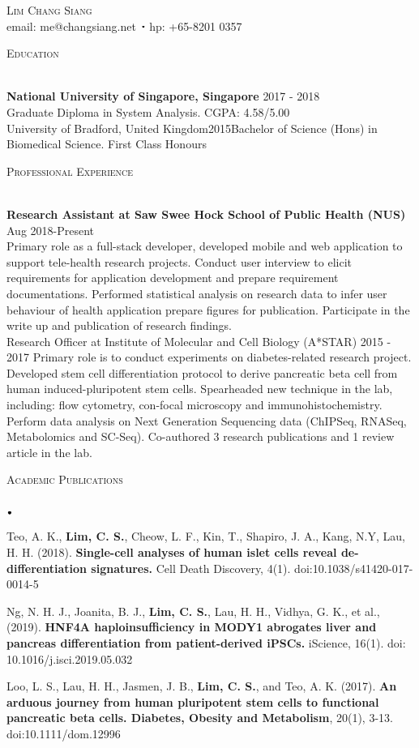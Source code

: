 \documentclass[11pt]{article}
\newcommand{\lineunder}{\vspace*{-8pt} \\ \hspace*{-18pt} \hrulefill \\}
\newcommand{\header}[1]{{\hspace*{-15pt}\vspace*{6pt} \textsc{#1}} \vspace*{-6pt} \lineunder}
\newcommand{\contact}[2]{
\begin{center}
{\LARGE \scshape {#1}}\\
#2
\end{center}
\vspace*{-8pt}
}
\newcommand{\sbt}{\,\begin{picture}(-1,1)(-1,-3)\circle*{2}\end{picture}\ }
\newcommand{\lbt}{\,\begin{picture}(-1,1)(-1,-3)\circle*{3}\end{picture}\ }
\newenvironment{achievements}{
    \begin{list}{$\lbt$}{
        \topsep 0pt
        \itemsep 0pt
        \addtolength{\leftmargin}{-0.1in}
    }
}
{
    \vspace*{4pt}
    \end{list}
}
\newcommand{\schoolwithcourses}[4]{
 \textbf{#1} \hfill{#2}\\
    #3\\
\vspace*{5pt}
}
\begin{document}

\small
\smallskip
\vspace*{-35pt}

\contact{Lim Chang Siang}
{email: me@changsiang.net $\sbt$ hp: +65-8201 0357}

\header{Education}
\vspace{2mm}
\schoolwithcourses{National University of Singapore, Singapore}{2017 - 2018}{Graduate Diploma in System Analysis. CGPA: 4.58/5.00}

\schoolwithcourses{University of Bradford, United Kingdom}{2015}{Bachelor of Science (Hons) in Biomedical Science. First Class Honours}
\hfill{}


\header{Professional Experience}
\vspace{2mm}
\schoolwithcourses{Research Assistant at Saw Swee Hock School of Public Health (NUS)}{ Aug 2018-Present}
{Primary role as a full-stack developer, developed mobile and web application to support tele-health research projects. Conduct user interview to elicit requirements for application development and prepare requirement documentations. Performed statistical analysis on research data to infer user behaviour of health application prepare figures for publication. Participate in the write up and publication of research findings.}

\schoolwithcourses{Research Officer at Institute of Molecular and Cell Biology (A*STAR)}{
2015 - 2017}
{Primary role is to conduct experiments on diabetes-related research project. Developed stem cell differentiation protocol to derive pancreatic beta cell from human induced-pluripotent stem cells. Spearheaded new technique in the lab, including: flow cytometry, con-focal microscopy and immunohistochemistry. Perform data analysis on Next Generation Sequencing data (ChIPSeq, RNASeq, Metabolomics and SC-Seq). Co-authored 3 research publications and 1 review article in the lab.}
\hfill{}

\header{Academic Publications}
\vspace{2mm}
\begin{achievements}
\justifying
\item {Teo, A. K., \textbf{Lim, C. S.}, Cheow, L. F., Kin, T., Shapiro, J. A., Kang, N.Y, Lau, H. H. (2018). \textbf{Single-cell analyses of human islet cells reveal de-differentiation signatures.} Cell Death Discovery, 4(1). doi:10.1038/s41420-017-0014-5}
\item {Ng, N. H. J., Joanita, B. J., \textbf{Lim, C. S.}, Lau, H. H., Vidhya, G. K., et al., (2019). \textbf{HNF4A haploinsufficiency in MODY1 abrogates liver and pancreas differentiation from patient-derived iPSCs.} iScience, 16(1). doi: 10.1016/j.isci.2019.05.032}
\item {Loo, L. S., Lau, H. H., Jasmen, J. B., \textbf{Lim, C. S.}, and Teo, A. K. (2017). \textbf{An arduous journey from human pluripotent stem cells to functional pancreatic beta cells. Diabetes, Obesity and Metabolism}, 20(1), 3-13. doi:10.1111/dom.12996}
\end{achievements}
\hfill{}
\end{document}
